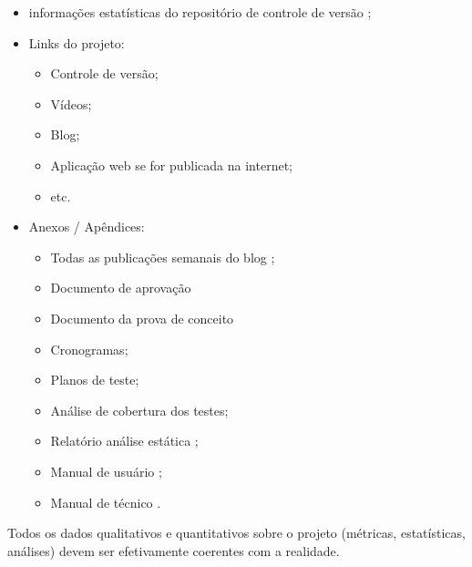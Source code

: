 \begin{itemize}
    \item informações estatísticas do repositório de controle de versão ;
    
    \item Links do projeto:
    \begin{itemize}
        \item Controle de versão;
        
        \item Vídeos;
        
        \item Blog;
        
        \item Aplicação web se for publicada na internet;
        
        \item etc.
    \end{itemize}
    
    \item Anexos / Apêndices: 
    \begin{itemize}
        \item Todas as publicações semanais do blog ;
        
        \item Documento de aprovação 

        \item Documento da prova de conceito 

        \item Cronogramas;
        
        \item Planos de teste;
        
        \item Análise de cobertura dos testes;
        
        \item Relatório análise estática ;
        
        \item Manual de usuário ;
        
        \item Manual de técnico .
        
    \end{itemize}
\end{itemize}

Todos os dados qualitativos e quantitativos sobre o projeto (métricas, estatísticas, análises) devem ser efetivamente coerentes com a realidade.

